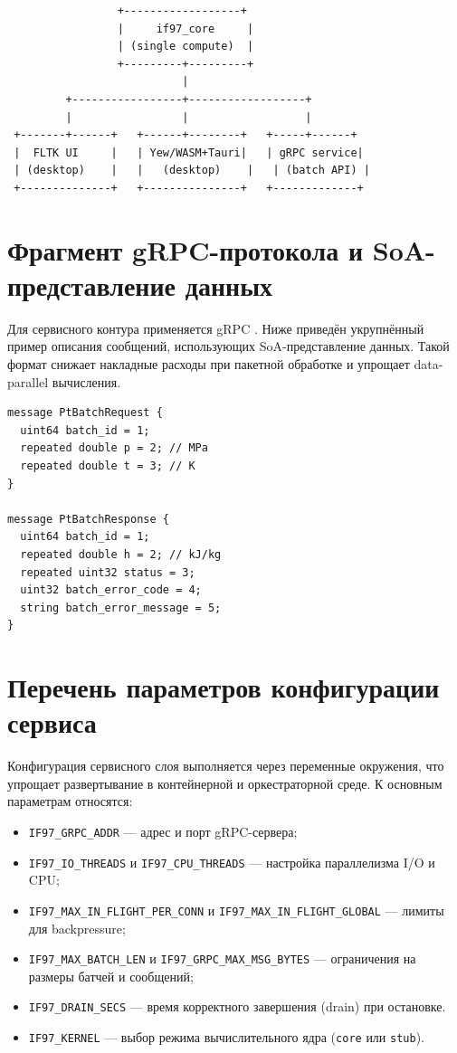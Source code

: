 \begin{appendices}
\begin{verbatim}
                 +------------------+
                 |     if97_core     |
                 | (single compute)  |
                 +---------+---------+
                           |
         +-----------------+------------------+
         |                 |                  |
 +-------+------+   +------+--------+   +-----+------+
 |  FLTK UI     |   | Yew/WASM+Tauri|   | gRPC service|
 | (desktop)    |   |   (desktop)    |   | (batch API) |
 +--------------+   +---------------+   +-------------+
\end{verbatim}

\section{Фрагмент gRPC-протокола и SoA-представление данных}

Для сервисного контура применяется gRPC \cite{grpc_docs}.  
Ниже приведён укрупнённый пример описания сообщений, использующих SoA-представление данных.  
Такой формат снижает накладные расходы при пакетной обработке и упрощает data-parallel вычисления.  

\begin{verbatim}
message PtBatchRequest {
  uint64 batch_id = 1;
  repeated double p = 2; // MPa
  repeated double t = 3; // K
}

message PtBatchResponse {
  uint64 batch_id = 1;
  repeated double h = 2; // kJ/kg
  repeated uint32 status = 3;
  uint32 batch_error_code = 4;
  string batch_error_message = 5;
}
\end{verbatim}

\section{Перечень параметров конфигурации сервиса}

Конфигурация сервисного слоя выполняется через переменные окружения, что упрощает развертывание в контейнерной и оркестраторной среде.  
К основным параметрам относятся:
\begin{itemize}
\item \texttt{IF97\_GRPC\_ADDR} --- адрес и порт gRPC-сервера;  
\item \texttt{IF97\_IO\_THREADS} и \texttt{IF97\_CPU\_THREADS} --- настройка параллелизма I/O и CPU;  
\item \texttt{IF97\_MAX\_IN\_FLIGHT\_PER\_CONN} и \texttt{IF97\_MAX\_IN\_FLIGHT\_GLOBAL} --- лимиты для backpressure;  
\item \texttt{IF97\_MAX\_BATCH\_LEN} и \texttt{IF97\_GRPC\_MAX\_MSG\_BYTES} --- ограничения на размеры батчей и сообщений;  
\item \texttt{IF97\_DRAIN\_SECS} --- время корректного завершения (drain) при остановке.  
\item \texttt{IF97\_KERNEL} --- выбор режима вычислительного ядра (\texttt{core} или \texttt{stub}).  
\end{itemize}


\end{appendices}
